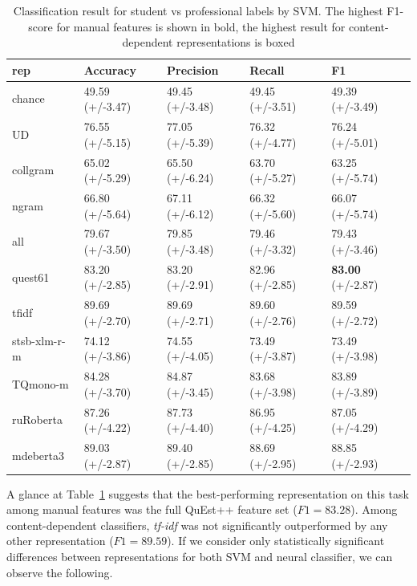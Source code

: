 \begin{table}[H]
	\centering
	\begin{tabular}{l|llll}
		\toprule
		rep   & Accuracy        & Precision       & Recall          & F1              \\
		\midrule
		chance          & 49.59 (+/-3.47) & 49.45 (+/-3.48) & 49.45 (+/-3.51) & 49.39 (+/-3.49) \\
		\midrule
		UD              & 76.55 (+/-5.15) & 77.05 (+/-5.39) & 76.32 (+/-4.77) & 76.24 (+/-5.01) \\
		collgram        & 65.02 (+/-5.29) & 65.50 (+/-6.24) & 63.70 (+/-5.27) & 63.25 (+/-5.74) \\
		ngram           & 66.80 (+/-5.64) & 67.11 (+/-6.12) & 66.32 (+/-5.60) & 66.07 (+/-5.74) \\
		all             & 79.67 (+/-3.50) & 79.85 (+/-3.48) & 79.46 (+/-3.32) & 79.43 (+/-3.46) \\
		quest61         & 83.20 (+/-2.85) & 83.20 (+/-2.91) & 82.96 (+/-2.85) & \textbf{83.00} (+/-2.87) \\
		\midrule
		tfidf           & 89.69 (+/-2.70) & 89.69 (+/-2.71) & 89.60 (+/-2.76) & \boxit{0.4in} 89.59 (+/-2.72) \\
		stsb-xlm-r-m          & 74.12 (+/-3.86) & 74.55 (+/-4.05) & 73.49 (+/-3.87) & 73.49 (+/-3.98) \\
		TQmono-m        & 84.28 (+/-3.70) & 84.87 (+/-3.45) & 83.68 (+/-3.98) & 83.89 (+/-3.89) \\
		ruRoberta & 87.26 (+/-4.22) & 87.73 (+/-4.40) & 86.95 (+/-4.25) & 87.05 (+/-4.29) \\
		mdeberta3  & 89.03 (+/-2.87) & 89.40 (+/-2.85) & 88.69 (+/-2.95) & 88.85 (+/-2.93)\\
		\bottomrule
	\end{tabular}
	\caption{\label{tab:stu-pro}Classification result for student vs professional labels by SVM. The highest F1-score for manual features is shown in bold, the highest result for content-dependent representations is boxed}
\end{table}

A glance at Table~\ref{tab:stu-pro} suggests that the best-performing representation on this task among manual features was the full QuEst++ feature set ($F1=83.28$). Among content-dependent classifiers, \textit{tf-idf} was not significantly outperformed by any other representation ($F1=89.59$). If we consider only statistically significant differences between representations for both SVM and neural classifier, we can observe the following. 


